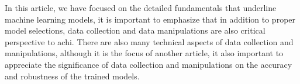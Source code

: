 
\par
In this article, we have focused on the detailed fundamentals that underline machine learning models, it is important to emphasize that in addition to proper model selections, data collection and data manipulations are also critical perspective to achi. There are also many technical aspects of data collection and manipulations, although it is the focus of another article, it also important to appreciate the significance of data collection and manipulations on the accuracy and robustness of the trained models.
\par 

